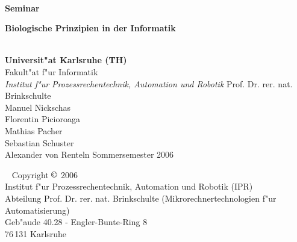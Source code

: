 \usepackage{epsf,amsthm,amsmath}
\usepackage[ngerman]{babel}
\usepackage[latin1]{inputenc}
\usepackage{graphicx}
\setlength{\parskip}{5pt plus 8pt minus 2pt}
\pagestyle{headings}

%
%
%


\begin{titlepage}
\ \vfill
\Large
\begin{center}
{\LARGE\bf Seminar} \\[1cm]
{\huge\bf Biologische Prinzipien in der Informatik\par}
\vspace*{1cm}

\\[1cm]
{\bf Universit"at Karlsruhe (TH)}\\
{Fakult"at f"ur Informatik}\\
{\em Institut f"ur Prozessrechentechnik, Automation und Robotik}
\vfill
Prof. Dr. rer. nat. Brinkschulte\\
Manuel Nickschas\\
Florentin Picioroaga\\
Mathias Pacher\\
Sebastian Schuster\\
Alexander von Renteln	  
\vfill\vfill 
Sommersemester 2006
\vfill
\vfill
\end{center}
\end{titlepage} 
% 
\thispagestyle{empty}
\ 
\vfill
\noindent
Copyright $\copyright$ 2006\\
Institut f"ur Prozessrechentechnik, Automation und Robotik (IPR)\\
Abteilung Prof. Dr. rer. nat. Brinkschulte (Mikrorechnertechnologien f"ur Automatisierung)\\
Geb"aude 40.28 - Engler-Bunte-Ring 8\\
76\,131 Karlsruhe
 
